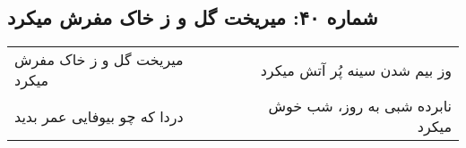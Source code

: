 \begin{center}
\section*{شماره ۴۰: میریخت گل و ز خاک مفرش میکرد}
\label{sec:040}
\begin{longtable}{l p{0.5cm} r}
میریخت گل و ز خاک مفرش میکرد
&&
وز بیم شدن سینه پُر آتش میکرد
\\
دردا که چو بیوفایی عمر بدید
&&
نابرده شبی به روز، شب خوش میکرد
\\
\end{longtable}
\end{center}
